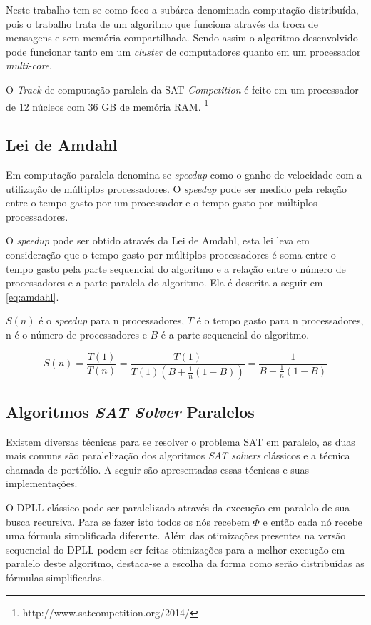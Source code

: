 \documentclass{ufsc-thesis}
\begin{document}
Neste trabalho tem-se como foco a subárea denominada computação distribuída, pois 
o trabalho trata de um algoritmo que funciona através da troca de mensagens e sem memória 
compartilhada\cite{Coulouris2011}. Sendo assim o algoritmo desenvolvido pode 
funcionar tanto em um \textit{cluster} de computadores quanto em um processador \textit{multi-core}.

O \textit{Track} de computação paralela da SAT \textit{Competition} é 
feito em um processador de 12 núcleos com 36 GB de memória RAM.
\footnote{http://www.satcompetition.org/2014/}

\subsection{Lei de Amdahl}
\label{sec:amdahl}

Em computação paralela denomina-se \textit{speedup} como o ganho de velocidade 
com a utilização de múltiplos processadores. O \textit{speedup} pode ser medido 
pela relação entre o tempo gasto por um processador e o tempo gasto por múltiplos 
processadores.

O \textit{speedup} pode ser obtido através da Lei de Amdahl\cite{Amdahl1967}, esta lei leva em 
consideração que o tempo gasto por múltiplos processadores é soma entre o tempo 
gasto pela parte sequencial do algoritmo e a relação entre o número de processadores 
e a parte paralela do algoritmo. Ela é descrita a seguir em \ref{eq:amdahl}.

$S(n)$ é o \textit{speedup} para n processadores, $T$ é o tempo gasto para n processadores, 
n é o número de processadores e $B$ é a parte sequencial do algoritmo.

\begin{equation} \label{eq:amdahl}
S(n)=\frac{T(1)}{T(n)}=\frac{T(1)}{T(1)(B+\frac{1}{n}(1-B))}=\frac{1}{B+\frac{1}{n}(1-B)}
\end{equation}

\subsection{Algoritmos \textit{SAT Solver} Paralelos}
\label{sec:satparallel}

Existem diversas técnicas para se resolver o problema SAT em paralelo, as duas mais 
comuns são paralelização dos algoritmos \textit{SAT solvers} clássicos e a técnica 
chamada de portfólio. A seguir são apresentadas essas técnicas e  suas implementações.

O DPLL clássico pode ser paralelizado através da execução em paralelo de sua busca recursiva. 
Para se fazer isto todos os nós recebem $\Phi$ e então cada nó recebe uma fórmula simplificada 
diferente. Além das otimizações presentes na versão sequencial do DPLL podem ser feitas 
otimizações para a melhor execução em paralelo deste algoritmo, destaca-se a escolha 
da forma como serão distribuídas as fórmulas simplificadas.
\end{document}
